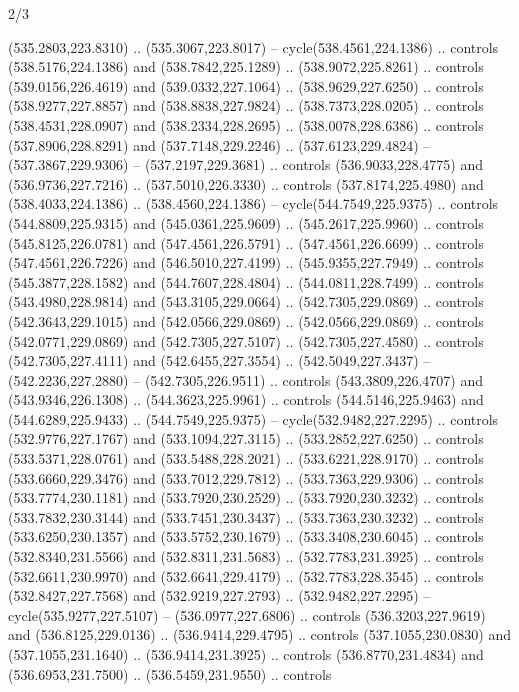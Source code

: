 \begin{flagdescription}{2/3}
\begin{scope}[xshift=0.5\flaglength,yshift=0.5\flagwidth,scale=\flagwidth/495.65]
\begin{scope}[y=0.8pt, x=0.8pt, yscale=-1,shift={(-463.76,-309.78)}]
  (535.2803,223.8310) .. (535.3067,223.8017) -- cycle(538.4561,224.1386) ..
  controls (538.5176,224.1386) and (538.7842,225.1289) .. (538.9072,225.8261) ..
  controls (539.0156,226.4619) and (539.0332,227.1064) .. (538.9629,227.6250) ..
  controls (538.9277,227.8857) and (538.8838,227.9824) .. (538.7373,228.0205) ..
  controls (538.4531,228.0907) and (538.2334,228.2695) .. (538.0078,228.6386) ..
  controls (537.8906,228.8291) and (537.7148,229.2246) .. (537.6123,229.4824) --
  (537.3867,229.9306) -- (537.2197,229.3681) .. controls (536.9033,228.4775) and
  (536.9736,227.7216) .. (537.5010,226.3330) .. controls (537.8174,225.4980) and
  (538.4033,224.1386) .. (538.4560,224.1386) -- cycle(544.7549,225.9375) ..
  controls (544.8809,225.9315) and (545.0361,225.9609) .. (545.2617,225.9960) ..
  controls (545.8125,226.0781) and (547.4561,226.5791) .. (547.4561,226.6699) ..
  controls (547.4561,226.7226) and (546.5010,227.4199) .. (545.9355,227.7949) ..
  controls (545.3877,228.1582) and (544.7607,228.4804) .. (544.0811,228.7499) ..
  controls (543.4980,228.9814) and (543.3105,229.0664) .. (542.7305,229.0869) ..
  controls (542.3643,229.1015) and (542.0566,229.0869) .. (542.0566,229.0869) ..
  controls (542.0771,229.0869) and (542.7305,227.5107) .. (542.7305,227.4580) ..
  controls (542.7305,227.4111) and (542.6455,227.3554) .. (542.5049,227.3437) --
  (542.2236,227.2880) -- (542.7305,226.9511) .. controls (543.3809,226.4707) and
  (543.9346,226.1308) .. (544.3623,225.9961) .. controls (544.5146,225.9463) and
  (544.6289,225.9433) .. (544.7549,225.9375) -- cycle(532.9482,227.2295) ..
  controls (532.9776,227.1767) and (533.1094,227.3115) .. (533.2852,227.6250) ..
  controls (533.5371,228.0761) and (533.5488,228.2021) .. (533.6221,228.9170) ..
  controls (533.6660,229.3476) and (533.7012,229.7812) .. (533.7363,229.9306) ..
  controls (533.7774,230.1181) and (533.7920,230.2529) .. (533.7920,230.3232) ..
  controls (533.7832,230.3144) and (533.7451,230.3437) .. (533.7363,230.3232) ..
  controls (533.6250,230.1357) and (533.5752,230.1679) .. (533.3408,230.6045) ..
  controls (532.8340,231.5566) and (532.8311,231.5683) .. (532.7783,231.3925) ..
  controls (532.6611,230.9970) and (532.6641,229.4179) .. (532.7783,228.3545) ..
  controls (532.8427,227.7568) and (532.9219,227.2793) .. (532.9482,227.2295) --
  cycle(535.9277,227.5107) -- (536.0977,227.6806) .. controls
  (536.3203,227.9619) and (536.8125,229.0136) .. (536.9414,229.4795) .. controls
  (537.1055,230.0830) and (537.1055,231.1640) .. (536.9414,231.3925) .. controls
  (536.8770,231.4834) and (536.6953,231.7500) .. (536.5459,231.9550) .. controls

\end{scope}
\end{scope}
\end{flagdescription}
